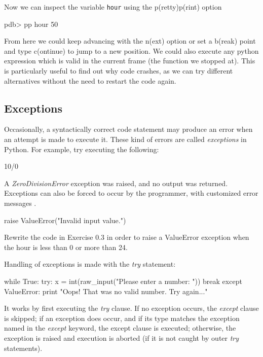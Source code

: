 \noindent Now we can inspect the variable \texttt{hour} using the p(retty)p(rint) option

\begin{python}
pdb> pp hour
50
\end{python}

From here we could keep advancing with the n(ext) option or set a b(reak) point
and type c(ontinue) to jump to a new position. We could also execute any python
expression which is valid in the current frame (the function we stopped at).
This is particularly useful to find out why code crashes, as we can try
different alternatives without the need to restart the code again.

\subsection{Exceptions}

Occasionally, a syntactically correct code statement may produce an error when
an attempt is made to execute it. These kind of errors are called
\textit{exceptions} in Python. For example, try executing the following:

\begin{python}
10/0
\end{python}

A \textit{ZeroDivisionError} exception was raised, and no output was returned.
Exceptions can also be forced to occur by the programmer, with customized error
messages \footnotemark{}.

\begin{python}
raise ValueError("Invalid input value.")
\end{python}

\begin{exercise}
Rewrite the code in Exercise 0.3 in order to raise a ValueError exception when
the hour is less than 0 or more than 24.  \end{exercise}

\noindent Handling of exceptions is made with the \textit{try} statement:

\begin{python}
while True:
    try:
        x = int(raw_input("Please enter a number: "))
        break
    except ValueError:
        print "Oops! That was no valid number. Try again..."
\end{python}

It works by first executing the \textit{try} clause. If no exception occurs, the \textit{except} clause is skipped; if an exception does occur, and if its type matches the exception named in the \textit{except} keyword, the except clause is executed; otherwise, the exception is raised and execution is aborted (if it is not caught by outer \textit{try} statements).


